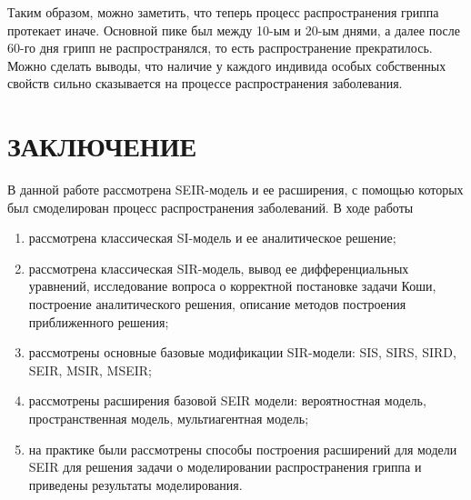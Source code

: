 \documentclass[a4paper, 14pt]{extreport}
\begin{document}
	Таким образом, можно заметить, что теперь процесс распространения гриппа протекает иначе. Основной пике был между 10-ым и 20-ым днями, а далее после 60-го дня грипп не распространялся, то есть распространение прекратилось. Можно сделать выводы, что наличие у каждого индивида особых собственных свойств сильно сказывается на процессе распространения заболевания.
	
	
	\chapter*{ЗАКЛЮЧЕНИЕ}
	В данной работе рассмотрена SEIR-модель и ее расширения, с помощью которых был смоделирован процесс распространения заболеваний.
	В ходе работы
	\begin{enumerate}
		\item рассмотрена классическая SI-модель и ее аналитическое решение;
		\item рассмотрена классическая SIR-модель, вывод ее дифференциальных уравнений, исследование вопроса о корректной постановке задачи Коши, построение аналитического решения, описание методов построения приближенного решения;
		\item рассмотрены основные базовые модификации SIR-модели: SIS, SIRS, SIRD, SEIR, MSIR, MSEIR;
		\item рассмотрены расширения базовой SEIR модели: вероятностная модель, пространственная модель, мультиагентная модель;
		\item на практике были рассмотрены способы построения расширений для модели SEIR для решения задачи о моделировании распространения гриппа и приведены результаты моделирования.
	\end{enumerate}
	
	\newpage
\end{document}
